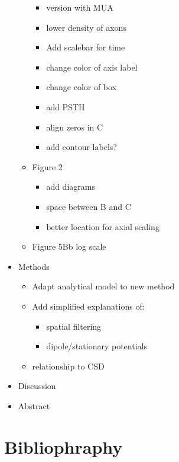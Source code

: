 \documentclass[]{article}
\providecommand{\tightlist}{%
  \setlength{\itemsep}{0pt}\setlength{\parskip}{0pt}}
\begin{document}
\begin{itemize}
\begin{itemize}
    \begin{itemize}
    \tightlist
    \item
      version with MUA
    \item
      lower density of axons
    \item
      Add scalebar for time
    \item
      change color of axis label
    \item
      change color of box
    \item
      add PSTH
    \item
      align zeros in C
    \item
      add contour labels?
    \end{itemize}
  \item
    Figure 2

    \begin{itemize}
    \tightlist
    \item
      add diagrams
    \item
      space between B and C
    \item
      better location for axial scaling
    \end{itemize}
  \item
    Figure 5Bb log scale
  \end{itemize}
\item
  Methods

  \begin{itemize}
  \tightlist
  \item
    Adapt analytical model to new method
  \item
    Add simplified explanations of:

    \begin{itemize}
    \tightlist
    \item
      spatial filtering
    \item
      dipole/stationary potentials
    \end{itemize}
  \item
    relationship to CSD
  \end{itemize}
\item
  Discussion
\item
  Abstract
\end{itemize}

\section*{Bibliophraphy}\label{bibliophraphy}
\end{document}
